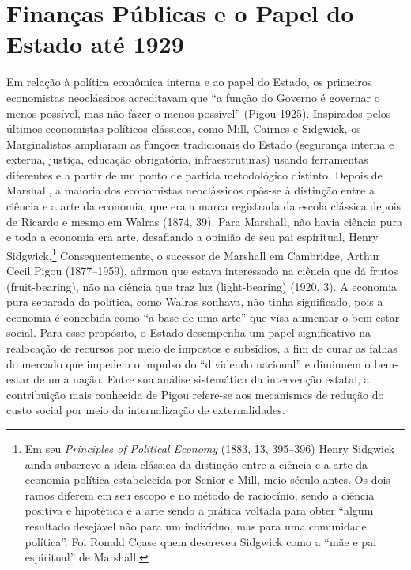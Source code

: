 \documentclass[12pt]{article}
\begin{document}
\section*{Finanças Públicas e o Papel do Estado até 1929}

Em relação à política econômica interna e ao papel do Estado, os primeiros economistas neoclássicos acreditavam que “a função do Governo é governar o menos possível, mas não fazer o menos possível” (Pigou 1925). Inspirados pelos últimos economistas políticos clássicos, como Mill, Cairnes e Sidgwick, os Marginalistas ampliaram as funções tradicionais do Estado (segurança interna e externa, justiça, educação obrigatória, infraestruturas) usando ferramentas diferentes e a partir de um ponto de partida metodológico distinto. Depois de Marshall, a maioria dos economistas neoclássicos opôs-se à distinção entre a ciência e a arte da economia, que era a marca registrada da escola clássica depois de Ricardo e mesmo em Walras (1874, 39). Para Marshall, não havia ciência pura e toda a economia era arte, desafiando a opinião de seu pai espiritual, Henry Sidgwick.\footnote{Em seu \textit{Principles of Political Economy} (1883, 13, 395–396) Henry Sidgwick ainda subscreve a ideia clássica da distinção entre a ciência e a arte da economia política estabelecida por Senior e Mill, meio século antes. Os dois ramos diferem em seu escopo e no método de raciocínio, sendo a ciência positiva e hipotética e a arte sendo a prática voltada para obter “algum resultado desejável não para um indivíduo, mas para uma comunidade política”. Foi Ronald Coase quem descreveu Sidgwick como a “mãe e pai espiritual” de Marshall.} Consequentemente, o sucessor de Marshall em Cambridge, Arthur Cecil Pigou (1877–1959), afirmou que estava interessado na ciência que dá frutos (fruit-bearing), não na ciência que traz luz (light-bearing) (1920, 3). A economia pura separada da política, como Walras sonhava, não tinha significado, pois a economia é concebida como “a base de uma arte” que visa aumentar o bem-estar social. Para esse propósito, o Estado desempenha um papel significativo na realocação de recursos por meio de impostos e subsídios, a fim de curar as falhas do mercado que impedem o impulso do “dividendo nacional” e diminuem o bem-estar de uma nação. Entre sua análise sistemática da intervenção estatal, a contribuição mais conhecida de Pigou refere-se aos mecanismos de redução do custo social por meio da internalização de externalidades.
\end{document}
